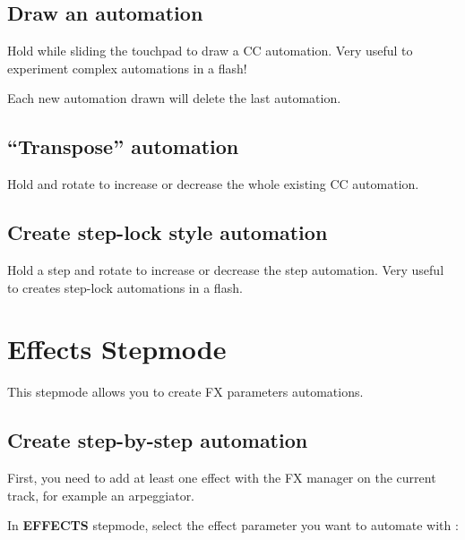 \subsection{Draw an automation}

Hold  while sliding the touchpad to draw a CC automation. Very useful to experiment complex automations in a flash!


Each new automation drawn will delete the last automation.

\subsection{``Transpose'' automation}

Hold  and rotate \encodericon{} to increase or decrease the whole existing CC automation.

\subsection{Create step-lock style automation}

Hold a step \padsicon{} and rotate \encodericon{} to increase or decrease the step automation. Very useful to creates step-lock automations in a flash.



\section{Effects Stepmode}

This stepmode allows you to create FX parameters automations.

\subsection{Create step-by-step automation}

First, you need to add at least one effect with the FX manager on the current track, for example an arpeggiator.

In \textbf{EFFECTS} stepmode, select the effect parameter you want to automate with \encodericon{}:



